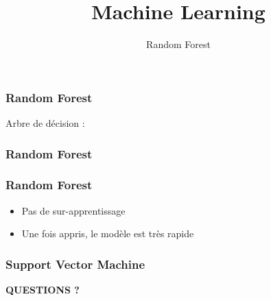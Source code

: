 \documentclass{formation}
\title{Machine Learning}
\subtitle{Random Forest}
\begin{document}
\maketitle

\begin{frame}
  \frametitle{Random Forest}
  Arbre de décision :
\end{frame}

\begin{frame}
  \frametitle{Random Forest}
\end{frame}

\begin{frame}
  \frametitle{Random Forest}
  \begin{itemize}
  \item Pas de sur-apprentissage
  \item Une fois appris, le modèle est très rapide
  \end{itemize}
\end{frame}

\begin{frame}
  \frametitle{Support Vector Machine}
  \begin{center}
   \textbf{QUESTIONS ?}
  \end{center}
\end{frame}
\end{document}
